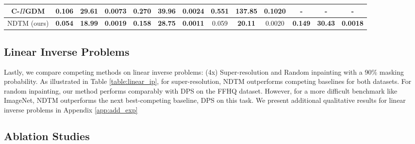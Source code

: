 \begin{table*}[]
\begin{tabular}{@{}ccccccc|cccccc@{}}
C-$\Pi$GDM  & 0.106          & 29.61            & 0.0073           & 0.270          & 39.96            & 0.0024           & 0.551          & 137.85           & 0.1020           &    -            &       -           &            -      \\ \midrule
NDTM (ours) & \textbf{0.054} & \textbf{18.99}   & \textbf{0.0019}  & \textbf{0.158} & \textbf{28.75}   & \textbf{0.0011}  & 0.059          & \textbf{20.11}   & 0.0020           & \textbf{0.149} & \textbf{30.43}   & \textbf{0.0018}  \\ \bottomrule
\end{tabular}
\label{table:linear_ip}
\end{table*}

\subsection{Linear Inverse Problems}
Lastly, we compare competing methods on linear inverse problems: (4x) Super-resolution and Random inpainting with a 90\% masking probability. As illustrated in Table \ref{table:linear_ip}, for super-resolution, NDTM outperforms competing baselines for both datasets. For random inpainting, our method performs comparably with DPS on the FFHQ dataset. However, for a more difficult benchmark like ImageNet, NDTM outperforms the next best-competing baseline, DPS on this task. We present additional qualitative results for linear inverse problems in Appendix \ref{app:add_exp}

\subsection{Ablation Studies}

\begin{figure*}
    \centering
    \caption{\textbf{Impact of different design choices} in NDTM on Distortion (PSNR) and Perception (LPIPS) for the non-linear deblur task. (a, b) The extent of guidance can be jointly controlled by varying the terminal loss weight ($w_T$) and the weight ($\gamma$). (c, d) Compute vs quality can be traded off by jointly varying the number of optimization steps (N) and the number of diffusion steps.}
    \label{fig:ablation}
\end{figure*}

